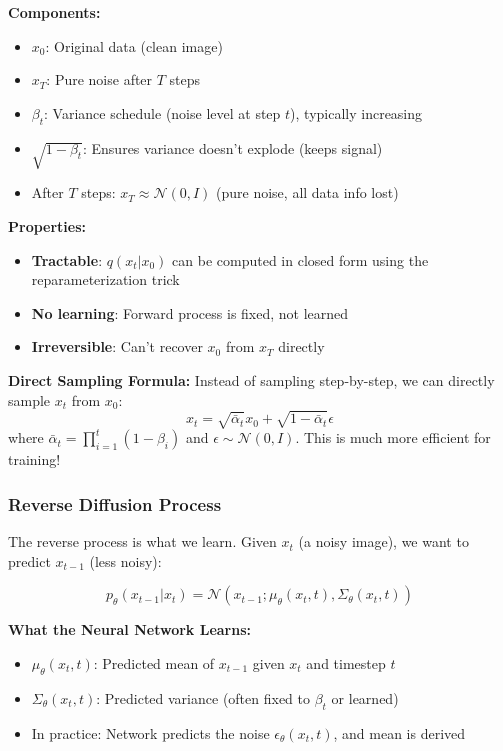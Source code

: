 \documentclass[12pt,a4paper]{article}
\begin{document}
\textbf{Components:}
\begin{itemize}
    \item $x_0$: Original data (clean image)
    \item $x_T$: Pure noise after $T$ steps
    \item $\beta_t$: Variance schedule (noise level at step $t$), typically increasing
    \item $\sqrt{1-\beta_t}$: Ensures variance doesn't explode (keeps signal)
    \item After $T$ steps: $x_T \approx \mathcal{N}(0, I)$ (pure noise, all data info lost)
\end{itemize}

\textbf{Properties:}
\begin{itemize}
    \item \textbf{Tractable}: $q(x_t | x_0)$ can be computed in closed form using the reparameterization trick
    \item \textbf{No learning}: Forward process is fixed, not learned
    \item \textbf{Irreversible}: Can't recover $x_0$ from $x_T$ directly
\end{itemize}

\textbf{Direct Sampling Formula:} Instead of sampling step-by-step, we can directly sample $x_t$ from $x_0$:
\begin{equation}
x_t = \sqrt{\bar{\alpha}_t} x_0 + \sqrt{1-\bar{\alpha}_t} \epsilon
\end{equation}
where $\bar{\alpha}_t = \prod_{i=1}^t (1-\beta_i)$ and $\epsilon \sim \mathcal{N}(0, I)$. This is much more efficient for training!

\subsubsection{Reverse Diffusion Process}

The reverse process is what we learn. Given $x_t$ (a noisy image), we want to predict $x_{t-1}$ (less noisy):

\begin{equation}
p_\theta(x_{t-1} | x_t) = \mathcal{N}(x_{t-1}; \mu_\theta(x_t, t), \Sigma_\theta(x_t, t))
\end{equation}

\textbf{What the Neural Network Learns:}
\begin{itemize}
    \item $\mu_\theta(x_t, t)$: Predicted mean of $x_{t-1}$ given $x_t$ and timestep $t$
    \item $\Sigma_\theta(x_t, t)$: Predicted variance (often fixed to $\beta_t$ or learned)
    \item In practice: Network predicts the noise $\epsilon_\theta(x_t, t)$, and mean is derived
\end{itemize}
\end{document}

